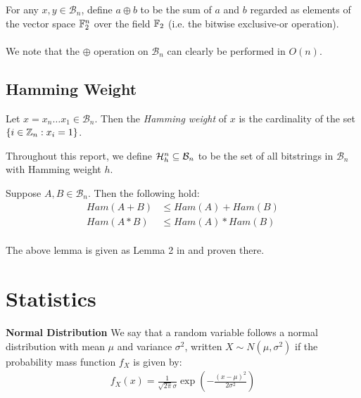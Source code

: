 \theoremstyle{definition}
\begin{definition}
For any $x, y \in \mathcal{B}_n$, define $a \oplus b$ to be the sum of $a$ and $b$ regarded as elements of the vector space $\mathbb{F}_2^{n}$ over the field $\mathbb{F}_2$ (i.e. the bitwise exclusive-or operation).
\end{definition}

\paragraph{}
We note that the $\oplus$ operation on $\mathcal{B}_n$ can clearly be performed in $O(n)$.

\subsection{Hamming Weight}

\theoremstyle{definition}
\begin{definition}
Let $x = x_n \dots x_1 \in \mathcal{B}_n$. Then the \textit{Hamming weight} of $x$ is the cardinality of the set $\{i \in \mathbb{Z}_n: x_i = 1 \}$.
\end{definition}

Throughout this report, we define $\mathcal{H}_h^n \subseteq \mathcal{B}_n$ to be the set of all bitstrings in $\mathcal{B}_n$ with Hamming weight $h$.

\begin{lemma}
Suppose $A, B \in \mathcal{B}_n$. Then the following hold:
\begin{align*}
    Ham(A + B) &\leq Ham(A) + Ham(B)\\
    Ham(A * B) &\leq Ham(A) * Ham(B)
\end{align*}
\end{lemma}

\paragraph{}
The above lemma is given as Lemma 2 in \cite{aggarwal2018new} and proven there.

\section{Statistics}

\begin{definition}{\textbf{Normal Distribution}}
We say that a random variable follows a normal distribution with mean $\mu$ and variance $\sigma^2$, written $X \sim N(\mu, \sigma^2)$ if the probability mass function $f_X$ is given by:
\begin{align*}
    f_X(x) = \frac{1}{\sqrt{2 \pi} \sigma} \exp{(-\frac{(x - \mu)^2}{2 \sigma^2})}
\end{align*}
\end{definition}

